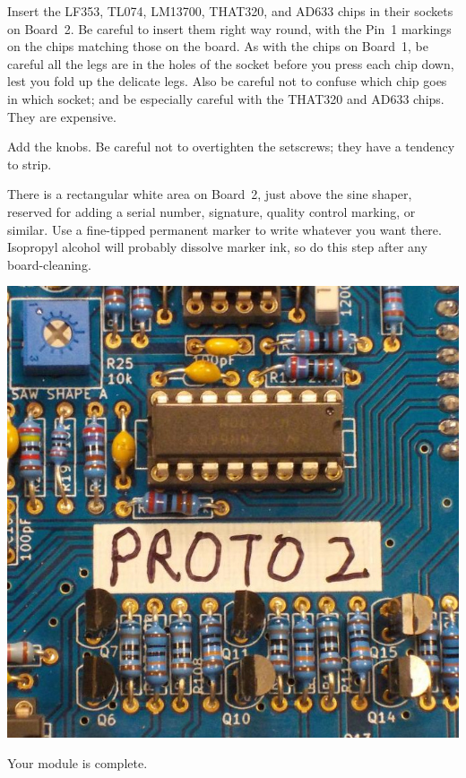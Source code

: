 Insert the LF353, TL074, LM13700, THAT320, and AD633 chips in their sockets
on Board~2.  Be careful to insert them right way round, with the Pin~1
markings on the chips matching those on the board.  As with the chips on
Board~1, be careful all the legs are in the holes of the socket before you
press each chip down, lest you fold up the delicate legs.  Also be careful
not to confuse which chip goes in which socket; and be especially careful
with the THAT320 and AD633 chips.  They are expensive.

\pagebreak

Add the knobs.  Be careful not to overtighten the setscrews; they have a
tendency to strip.

There is a rectangular white area on Board~2, just above the sine shaper,
reserved for adding a serial number, signature, quality control marking, or
similar.  Use a fine-tipped permanent marker to write whatever you want
there.  Isopropyl alcohol will probably dissolve marker ink, so do this step
after any board-cleaning.

\nopagebreak
\noindent\includegraphics[width=\linewidth]{serial.jpg}

Your module is complete.
